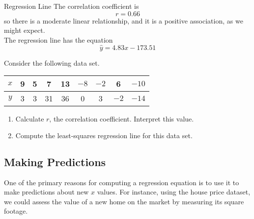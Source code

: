 \begin{example}[https://www.youtube.com/watch?v=kcSr2C6I_-A&list=PLfmpjsIzhzttL_Uec2nCbDRcAcUF7NKG8&index=20]{Regression Line}
The correlation coefficient is
\[\boxed{r = 0.66}\]
so there is a moderate linear relationship, and it is a positive association, as we might expect.\\

The regression line has the equation
\[\boxed{\hat{y} = 4.83x-173.51}\]
\end{example}

\begin{try}
Consider the following data set.
\begin{center}
\begin{tabular}{c | c c c c c c c c}
$x$ & 9 & 5 & 7 & 13 & $-8$ & $-2$ & 6 & $-10$\\
\hline
$y$ & 3 & 3 & 31 & 36 & 0 & 3 & $-2$ & $-14$
\end{tabular}
\end{center}
\begin{enumerate}
\item Calculate $r$, the correlation coefficient.  Interpret this value.
\item Compute the least-squares regression line for this data set.
\end{enumerate}
\end{try}
\vfill
\pagebreak

\subsection{Making Predictions}
One of the primary reasons for computing a regression equation is to use it to make predictions about new $x$ values.  For instance, using the house price dataset, we could assess the value of a new home on the market by measuring its square footage.

